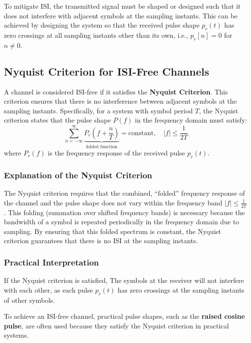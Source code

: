 \documentclass[10pt]{article}
\begin{document}
To mitigate ISI, the transmitted signal must be shaped or designed such that it does not interfere with adjacent symbols at the sampling instants. This can be achieved by designing the system so that the received pulse shape \( p_r(t) \) has zero crossings at all sampling instants other than its own, i.e., \( p_r[n] = 0 \) for \( n \neq 0 \).

\subsection{Nyquist Criterion for ISI-Free Channels}
A channel is considered ISI-free if it satisfies the \textbf{Nyquist Criterion}. This criterion ensures that there is no interference between adjacent symbols at the sampling instants. Specifically, for a system with symbol period \( T \), the Nyquist criterion states that the pulse shape \( P(f) \) in the frequency domain must satisfy:
\[
    \sum_{n=-\infty}^{\infty} \underbrace{P_r\left(f + \frac{n}{T}\right)}_{\text{folded function}} = \text{constant}, \quad |f| \le \frac{1}{2T}
\]
where \( P_r(f) \) is the frequency response of the received pulse \( p_r(t) \).

\subsubsection{Explanation of the Nyquist Criterion}
The Nyquist criterion requires that the combined, ``folded'' frequency response of the channel and the pulse shape does not vary within the frequency band \( |f| \le \frac{1}{2T} \). This folding (summation over shifted frequency bands) is necessary because the bandwidth of a symbol is repeated periodically in the frequency domain due to sampling. By ensuring that this folded spectrum is constant, the Nyquist criterion guarantees that there is no ISI at the sampling instants.

\subsubsection{Practical Interpretation}
If the Nyquist criterion is satisfied, The symbols at the receiver will not interfere with each other, as each pulse \( p_r(t) \) has zero crossings at the sampling instants of other symbols.

To achieve an ISI-free channel, practical pulse shapes, such as the \textbf{raised cosine pulse}, are often used because they satisfy the Nyquist criterion in practical systems.
\end{document}

